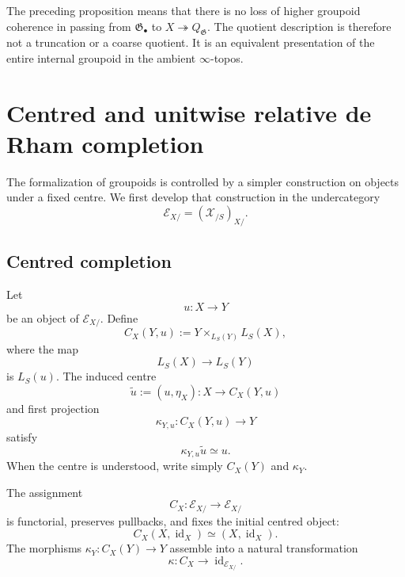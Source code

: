 \begin{remark}
\label{rem:quotient-language-primary}
The preceding proposition means that there is no loss of higher groupoid
coherence in passing from $\mathfrak G_\bullet$ to
$X\twoheadrightarrow Q_{\mathfrak G}$.  The quotient description is therefore
not a truncation or a coarse quotient.  It is an equivalent presentation of the
entire internal groupoid in the ambient $\infty$-topos.
\end{remark}


\section{Centred and unitwise relative de Rham completion}
\label{sec:flg-unitwise-formalization}

The formalization of groupoids is controlled by a simpler construction on
objects under a fixed centre.  We first develop that construction in the
undercategory
\[
    \mathcal E_{X/}
    =
    (\mathcal X_{/S})_{X/}.
\]

\subsection{Centred completion}

\begin{definition}
\label{def:centred-dr-completion}
Let
\[
    u:X\longrightarrow Y
\]
be an object of $\mathcal E_{X/}$.  Define
\[
    C_X(Y,u)
    :=
    Y\times_{L_S(Y)}L_S(X),
\]
where the map
\[
    L_S(X)\longrightarrow L_S(Y)
\]
is $L_S(u)$.  The induced centre
\[
    \widetilde u
    :=
    (u,\eta_X):
    X\longrightarrow C_X(Y,u)
\]
and first projection
\[
    \kappa_{Y,u}:
    C_X(Y,u)\longrightarrow Y
\]
satisfy
\[
    \kappa_{Y,u}\widetilde u\simeq u.
\]
When the centre is understood, write simply $C_X(Y)$ and $\kappa_Y$.
\end{definition}

\begin{proposition}
\label{prop:centred-completion-left-exact}
The assignment
\[
    C_X:\mathcal E_{X/}\longrightarrow\mathcal E_{X/}
\]
is functorial, preserves pullbacks, and fixes the initial centred object:
\[
    C_X(X,\operatorname{id}_X)
    \simeq
    (X,\operatorname{id}_X).
\]
The morphisms $\kappa_Y:C_X(Y)\to Y$ assemble into a natural transformation
\[
    \kappa:C_X\longrightarrow\operatorname{id}_{\mathcal E_{X/}}.
\]
\end{proposition}

